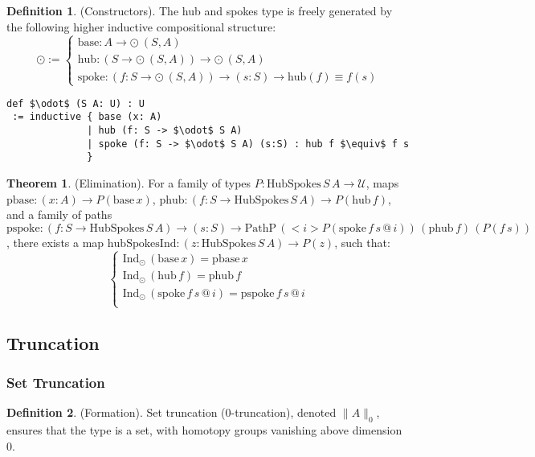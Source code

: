 \documentclass{article}
\theoremstyle{definition}
\newtheorem{theorem}{Theorem}
\newtheorem{definition}{Definition}
\begin{document}
\begin{definition} (Constructors).
The hub and spokes type is freely generated by the following higher inductive compositional structure:
\[
\odot :=
\begin{cases}
\text{base} : A \to \odot\ (S,A) \\
\text{hub} : (S \to \odot\ (S,A)) \to \odot\ (S,A) \\
\text{spoke} : (f : S \to \odot\ (S,A)) \to (s : S) \to \text{hub}(f) \equiv f(s)
\end{cases}
\]
\begin{lstlisting}[mathescape=true]
def $\odot$ (S A: U) : U
 := inductive { base (x: A)
              | hub (f: S -> $\odot$ S A)
              | spoke (f: S -> $\odot$ S A) (s:S) : hub f $\equiv$ f s
              }
\end{lstlisting}
\end{definition}

\begin{theorem} (Elimination).
For a family of types \( P : \text{HubSpokes} \, S \, A \to \mathcal{U} \),
maps \( \text{pbase} : (x : A) \to P(\text{base} \, x) \),
\( \text{phub} : (f : S \to \text{HubSpokes} \, S \, A) \to P(\text{hub} \, f) \),
and a family of paths
\( \text{pspoke} : (f : S \to \text{HubSpokes} \, S \, A) \to (s : S) \to \text{PathP} \, (<i> P(\text{spoke} \, f \, s \, @ \, i)) \, (\text{phub} \, f) \, (P(f \, s)) \),
there exists a map \( \text{hubSpokesInd} : (z : \text{HubSpokes} \, S \, A) \to P(z) \), such that:
\[
\begin{cases}
\text{Ind}_\odot \, (\text{base} \, x) = \text{pbase} \, x \\
\text{Ind}_\odot \, (\text{hub} \, f) = \text{phub} \, f \\
\text{Ind}_\odot \, (\text{spoke} \, f \, s \, @ \, i) = \text{pspoke} \, f \, s \, @ \, i \\
\end{cases}
\]
\end{theorem}

\newpage
\subsection{Truncation}
\subsubsection*{Set Truncation}
\begin{definition} (Formation).
Set truncation (0-truncation), denoted \( \| A \|_0 \),
ensures that the type is a set, with homotopy groups vanishing above dimension 0.
\end{definition}
\end{document}

